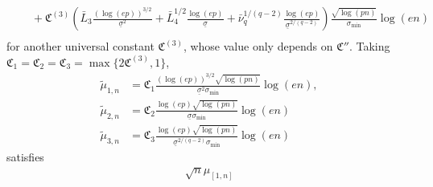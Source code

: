 \documentclass[aos]{imsart}
\begin{document}
\begin{appendix}
\begin{equation*}
\begin{aligned}
    & \quad + \mathfrak{C}^{(3)} \left(
        \bar{L}_{3} \frac{(\log(ep))^{3/2}}{\underline{\sigma}^2}
        + \bar{L}_{4}^{1/2} \frac{\log(ep)}{\underline{\sigma}}
        + \bar\nu_{q}^{1/(q-2)} \frac{\log(ep)}{\underline{\sigma}^{2/(q-2)}}
    \right)
    \frac{\sqrt{\log(pn)}}{\sigma_{\min}} \log\left(e n\right) \\
\end{aligned}
\end{equation*}
for another universal constant $\mathfrak{C}^{(3)}$, whose value only depends on $\mathfrak{C}''$.
Taking $\mathfrak{C}_1 = \mathfrak{C}_2 = \mathfrak{C}_3 = \max\{2 \mathfrak{C}^{(3)}, 1\}$,
\begin{equation*}
\begin{aligned}
    \tilde\mu_{1,n} 
    & = \mathfrak{C}_1 \frac{(\log(ep))^{3/2}\sqrt{\log(pn)}}{\underline\sigma^2\sigma_{\min}} \log\left(e n\right), \\
    \tilde\mu_{2,n}
    & = \mathfrak{C}_2 \frac{\log(ep)\sqrt{\log(pn)}}{\underline\sigma \sigma_{\min}} \log\left(e n\right) \\
    \tilde\mu_{3,n}
    & = \mathfrak{C}_3 \frac{\log(ep)\sqrt{\log(pn)}}{\underline\sigma^{2/(q-2)} \sigma_{\min}} \log\left(e n\right)
\end{aligned}
\end{equation*}
satisfies
\begin{equation*}
\begin{aligned}
    \sqrt{n} \mu_{[1,n]}

\end{aligned}
\end{equation*}
\end{appendix}
\end{document}
